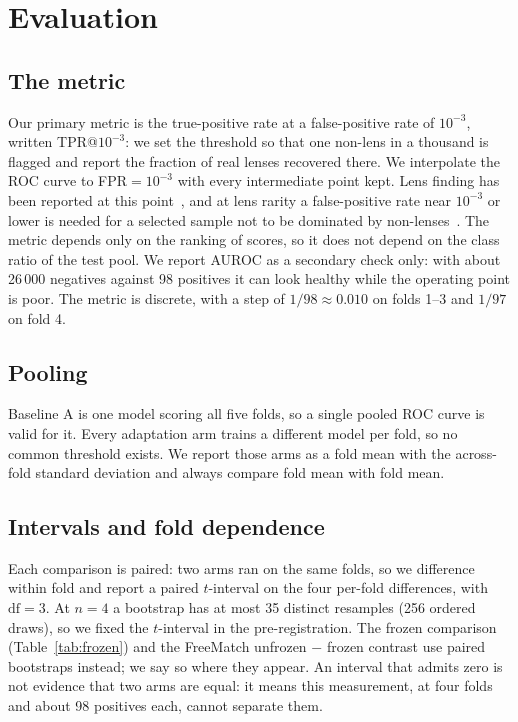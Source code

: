 \section{Evaluation}
\label{sec:eval}

\subsection{The metric}

Our primary metric is the true-positive rate at a false-positive rate of $10^{-3}$, written
TPR@$10^{-3}$: we set the threshold so that one non-lens in a thousand is flagged and report the
fraction of real lenses recovered there. We interpolate the ROC curve to FPR${}=10^{-3}$ with
every intermediate point kept. Lens finding has been reported at this
point~\citep{parul2024}, and at lens rarity a false-positive rate near $10^{-3}$ or lower is
needed for a selected sample not to be dominated by non-lenses~\citep{discoveryengineE}. The
metric depends only on the ranking of scores, so it does not depend on the class ratio of the
test pool. We
report AUROC as a secondary check only: with about 26\,000 negatives against 98 positives it
can look healthy while the operating point is poor. The metric is discrete, with a step of
$1/98 \approx 0.010$ on folds 1--3 and $1/97$ on fold 4.

\subsection{Pooling}

Baseline A is one model scoring all five folds, so a single pooled ROC curve is valid for it.
Every adaptation arm trains a different model per fold, so no common threshold exists. We
report those arms as a fold mean with the across-fold standard deviation and always compare
fold mean with fold mean.

\subsection{Intervals and fold dependence}
\label{sec:intervals}

Each comparison is paired: two arms ran on the same folds, so we difference within fold and
report a paired $t$-interval on the four per-fold differences, with $\mathrm{df} = 3$. At
$n = 4$ a bootstrap has at most 35 distinct resamples (256 ordered draws), so we fixed the $t$-interval in
the pre-registration. The frozen comparison (Table~\ref{tab:frozen}) and the FreeMatch
unfrozen $-$ frozen contrast use paired bootstraps instead; we say so where they appear. An
interval that admits zero is not evidence that two arms are equal: it
means this measurement, at four folds and about 98 positives each, cannot separate them.


